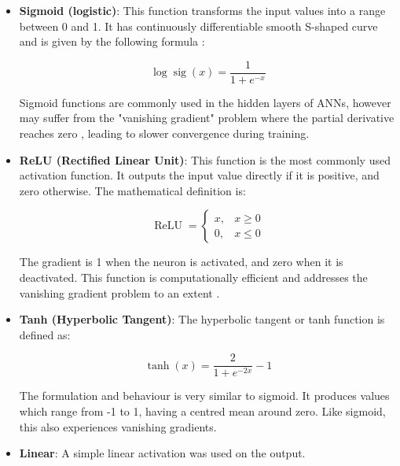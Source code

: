 \begin{itemize}
	\item \textbf{Sigmoid (logistic)}: This function transforms the input values into a range between 0 and 1. It has continuously differentiable smooth S-shaped curve and is given by the following formula \cite{Han1995}:
	
	\begin{equation}\label{Logistic sigmoid}
		\log \operatorname{sig}(x)=\frac{1}{1+e^{-x}}
	\end{equation} 
	
	Sigmoid functions are commonly used in the hidden layers of ANNs, however may suffer from the "vanishing gradient" problem where the partial derivative reaches zero \cite{Sharma2020}, leading to slower convergence during training.
	
	\item \textbf{ReLU (Rectified Linear Unit)}: This function is the most commonly used activation function. It outputs the input value directly if it is positive, and zero otherwise. The mathematical definition is:
	
	\begin{equation}\label{ReLU}
		\operatorname{ReLU}= \begin{cases}x, & x \geq 0 \\ 0, & x \leq 0\end{cases}
	\end{equation}
	
	The gradient is 1 when the neuron is activated, and zero when it is deactivated. This function is computationally efficient and addresses the vanishing gradient problem to an extent \cite{Sharma2020}.
	
	\item \textbf{Tanh (Hyperbolic Tangent)}: The hyperbolic tangent or tanh function is defined as:
	
	\begin{equation}\label{Hyperbolic tangent}
		\tanh (x)=\frac{2}{1+e^{-2 x}}-1
	\end{equation}
	
	The formulation and behaviour is very similar to sigmoid. It produces values which range from -1 to 1, having a centred mean around zero. Like sigmoid, this also experiences vanishing gradients.
	
	\item \textbf{Linear}: A simple linear activation was used on the output.
	
\end{itemize}

